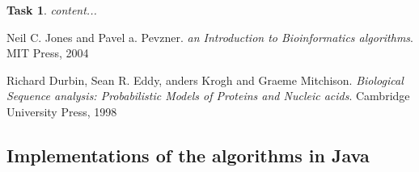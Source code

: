 \documentclass[11pt]{article} %
\theoremstyle{problemstyle}
\newtheorem{exercise}{Task}	%
\begin{document}
\begin{exercise} %
	content...
\end{exercise}

\begin{thebibliography}{3}
	
	Neil C. Jones and Pavel a. Pevzner. 
	\textit{an Introduction to Bioinformatics algorithms}. 
	MIT Press, 2004
	
	Richard Durbin, Sean R. Eddy, anders Krogh and Graeme Mitchison. 
	\textit{Biological Sequence analysis: Probabilistic Models of Proteins and Nucleic acids}. 
	Cambridge University Press, 1998
	
\end{thebibliography}

\newpage
\begin{appendices}
	\section{Implementations of the algorithms in Java} \label{app:alg}





\end{appendices}
\end{document}
